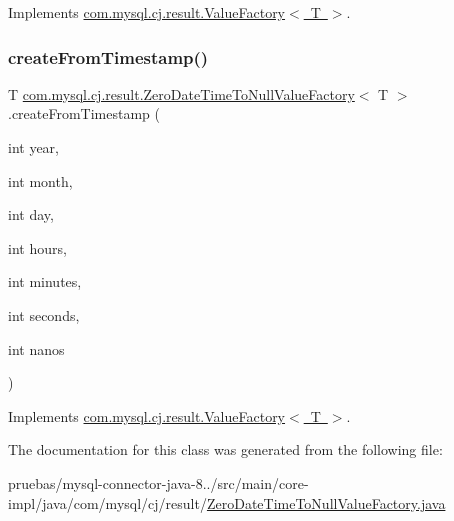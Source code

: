 Implements \mbox{\hyperlink{interfacecom_1_1mysql_1_1cj_1_1result_1_1_value_factory_a5edf0bed225d34bd1fade72d8f106760}{com.\+mysql.\+cj.\+result.\+Value\+Factory$<$ T $>$}}.

\mbox{\label{classcom_1_1mysql_1_1cj_1_1result_1_1_zero_date_time_to_null_value_factory_acda714c019ea312d52c002f606ca097b}} 
\subsubsection{\texorpdfstring{create\+From\+Timestamp()}{createFromTimestamp()}}
{\footnotesize\ttfamily T \mbox{\hyperlink{classcom_1_1mysql_1_1cj_1_1result_1_1_zero_date_time_to_null_value_factory}{com.\+mysql.\+cj.\+result.\+Zero\+Date\+Time\+To\+Null\+Value\+Factory}}$<$ T $>$.create\+From\+Timestamp (\begin{DoxyParamCaption}\item[{int}]{year,  }\item[{int}]{month,  }\item[{int}]{day,  }\item[{int}]{hours,  }\item[{int}]{minutes,  }\item[{int}]{seconds,  }\item[{int}]{nanos }\end{DoxyParamCaption})}



Implements \mbox{\hyperlink{interfacecom_1_1mysql_1_1cj_1_1result_1_1_value_factory_accbdc6c6970a22e40a0b1d72213334e6}{com.\+mysql.\+cj.\+result.\+Value\+Factory$<$ T $>$}}.



The documentation for this class was generated from the following file\+:\begin{DoxyCompactItemize}
\item 
pruebas/mysql-\/connector-\/java-\/8../src/main/core-\/impl/java/com/mysql/cj/result/\mbox{\hyperlink{_zero_date_time_to_null_value_factory_8java}{Zero\+Date\+Time\+To\+Null\+Value\+Factory.\+java}}\end{DoxyCompactItemize}
